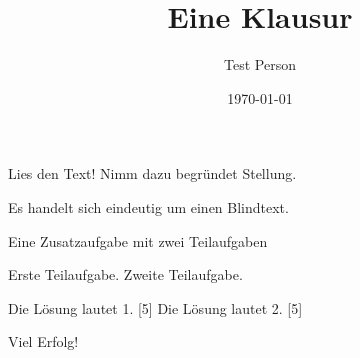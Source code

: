 \documentclass[a4paper]{scrartcl}
\author{Test Person}
\date{\today}
\title{Eine Klausur}
\begin{document}
\begin{aufgabe}
    \blindtext
    \begin{teilaufgaben}
        \teilaufgabe[5] Lies den Text!
        \teilaufgabe[10] Nimm dazu begründet Stellung.
    \end{teilaufgaben}
    \begin{loesung}
        Es handelt sich eindeutig um einen Blindtext.
    \end{loesung}
\end{aufgabe}

\begin{aufgabe*}
    Eine Zusatzaufgabe mit zwei Teilaufgaben
    \begin{teilaufgaben}
        \teilaufgabe Erste Teilaufgabe.
        \teilaufgabe Zweite Teilaufgabe.
    \end{teilaufgaben}
    \begin{loesung*}
        \begin{teilaufgaben}
            \teilaufgabe Die Lösung lautet 1.
                [5]
            \teilaufgabe Die Lösung lautet 2.
                [5]
        \end{teilaufgaben}
    \end{loesung*}
\end{aufgabe*}

\vspace{1cm}
{\Huge Viel Erfolg!}
\end{document}
